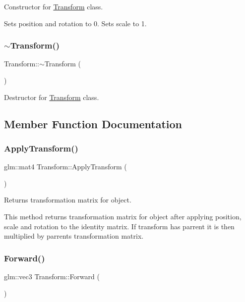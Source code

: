 Constructor for \mbox{\hyperlink{class_transform}{Transform}} class. 

Sets position and rotation to 0. Sets scale to 1. \mbox{\label{class_transform_aa72e286c069850db80927b0e6554cd3e}} 
\subsubsection{\texorpdfstring{$\sim$Transform()}{~Transform()}}
{\footnotesize\ttfamily Transform\+::$\sim$\+Transform (\begin{DoxyParamCaption}{ }\end{DoxyParamCaption})}



Destructor for \mbox{\hyperlink{class_transform}{Transform}} class. 



\subsection{Member Function Documentation}
\mbox{\label{class_transform_a550c9c8417c6d288e6352d6cc424a0e9}} 
\subsubsection{\texorpdfstring{ApplyTransform()}{ApplyTransform()}}
{\footnotesize\ttfamily glm\+::mat4 Transform\+::\+Apply\+Transform (\begin{DoxyParamCaption}{ }\end{DoxyParamCaption})}



Returns transformation matrix for object. 

This method returns transformation matrix for object after applying position, scale and rotation to the identity matrix. If transform has parrent it is then multiplied by parrent\textquotesingle{}s transformation matrix. \mbox{\label{class_transform_a5486927ebcb043b7347644041024f47c}} 
\subsubsection{\texorpdfstring{Forward()}{Forward()}}
{\footnotesize\ttfamily glm\+::vec3 Transform\+::\+Forward (\begin{DoxyParamCaption}{ }\end{DoxyParamCaption})\hspace{0.3cm}{\ttfamily [inline]}}



